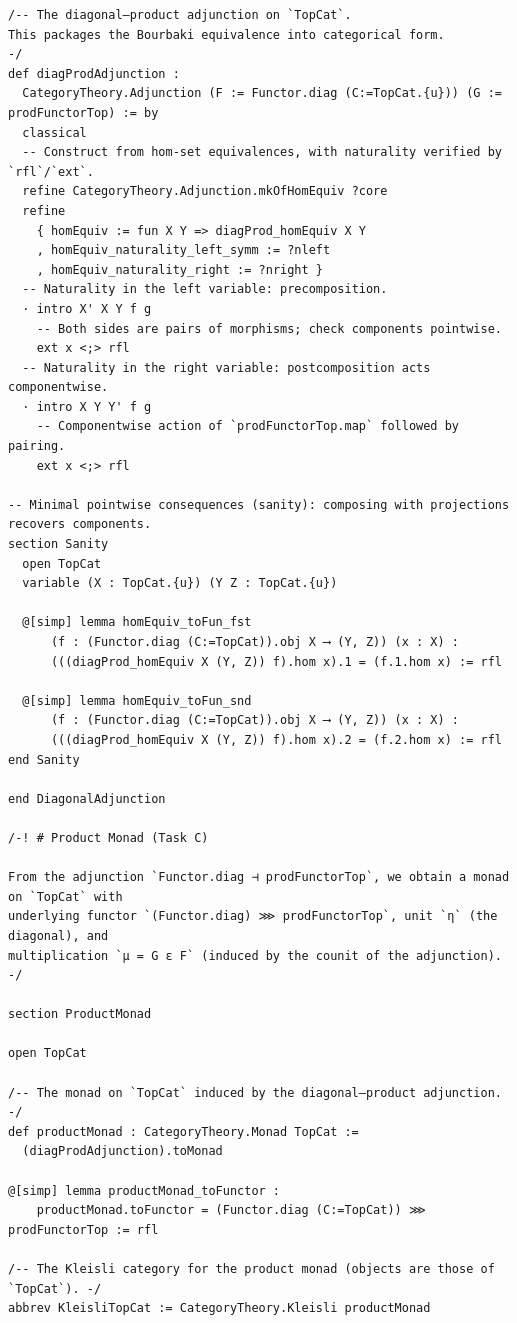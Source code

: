 \documentclass[12pt]{article}
\theoremstyle{definition}
\begin{document}
\begin{lstlisting}
/-- The diagonal–product adjunction on `TopCat`.
This packages the Bourbaki equivalence into categorical form.
-/
def diagProdAdjunction :
  CategoryTheory.Adjunction (F := Functor.diag (C:=TopCat.{u})) (G := prodFunctorTop) := by
  classical
  -- Construct from hom-set equivalences, with naturality verified by `rfl`/`ext`.
  refine CategoryTheory.Adjunction.mkOfHomEquiv ?core
  refine
    { homEquiv := fun X Y => diagProd_homEquiv X Y
    , homEquiv_naturality_left_symm := ?nleft
    , homEquiv_naturality_right := ?nright }
  -- Naturality in the left variable: precomposition.
  · intro X' X Y f g
    -- Both sides are pairs of morphisms; check components pointwise.
    ext x <;> rfl
  -- Naturality in the right variable: postcomposition acts componentwise.
  · intro X Y Y' f g
    -- Componentwise action of `prodFunctorTop.map` followed by pairing.
    ext x <;> rfl

-- Minimal pointwise consequences (sanity): composing with projections recovers components.
section Sanity
  open TopCat
  variable (X : TopCat.{u}) (Y Z : TopCat.{u})

  @[simp] lemma homEquiv_toFun_fst
      (f : (Functor.diag (C:=TopCat)).obj X ⟶ (Y, Z)) (x : X) :
      (((diagProd_homEquiv X (Y, Z)) f).hom x).1 = (f.1.hom x) := rfl

  @[simp] lemma homEquiv_toFun_snd
      (f : (Functor.diag (C:=TopCat)).obj X ⟶ (Y, Z)) (x : X) :
      (((diagProd_homEquiv X (Y, Z)) f).hom x).2 = (f.2.hom x) := rfl
end Sanity

end DiagonalAdjunction

/-! # Product Monad (Task C)

From the adjunction `Functor.diag ⊣ prodFunctorTop`, we obtain a monad on `TopCat` with
underlying functor `(Functor.diag) ⋙ prodFunctorTop`, unit `η` (the diagonal), and
multiplication `μ = G ε F` (induced by the counit of the adjunction).
-/

section ProductMonad

open TopCat

/-- The monad on `TopCat` induced by the diagonal–product adjunction. -/
def productMonad : CategoryTheory.Monad TopCat :=
  (diagProdAdjunction).toMonad

@[simp] lemma productMonad_toFunctor :
    productMonad.toFunctor = (Functor.diag (C:=TopCat)) ⋙ prodFunctorTop := rfl

/-- The Kleisli category for the product monad (objects are those of `TopCat`). -/
abbrev KleisliTopCat := CategoryTheory.Kleisli productMonad


\end{lstlisting}
\end{document}
